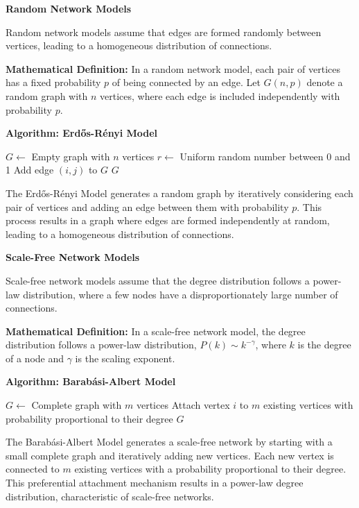 \documentclass[12pt]{book} %
\begin{document}
\textbf{Random Network Models}

Random network models assume that edges are formed randomly between vertices, leading to a homogeneous distribution of connections.

\textbf{Mathematical Definition:} In a random network model, each pair of vertices has a fixed probability \( p \) of being connected by an edge. Let \( G(n, p) \) denote a random graph with \( n \) vertices, where each edge is included independently with probability \( p \).

\textbf{Algorithm: Erdős-Rényi Model}
\FloatBarrier
\begin{algorithm}
\caption{Erdős-Rényi Model}
\begin{algorithmic}[1]
\State $G \gets$ Empty graph with $n$ vertices
        \State $r \gets$ Uniform random number between 0 and 1
            \State Add edge $(i, j)$ to $G$
        \EndIf
    \EndFor
\EndFor
\State \Return $G$
\EndFunction
\end{algorithmic}
\end{algorithm}
\FloatBarrier
The Erdős-Rényi Model generates a random graph by iteratively considering each pair of vertices and adding an edge between them with probability \( p \). This process results in a graph where edges are formed independently at random, leading to a homogeneous distribution of connections.

\textbf{Scale-Free Network Models}

Scale-free network models assume that the degree distribution follows a power-law distribution, where a few nodes have a disproportionately large number of connections.

\textbf{Mathematical Definition:} In a scale-free network model, the degree distribution follows a power-law distribution, \( P(k) \sim k^{-\gamma} \), where \( k \) is the degree of a node and \( \gamma \) is the scaling exponent.

\textbf{Algorithm: Barabási-Albert Model}
\FloatBarrier
\begin{algorithm}
\caption{Barabási-Albert Model}
\begin{algorithmic}[1]
\State $G \gets$ Complete graph with $m$ vertices
    \State Attach vertex $i$ to $m$ existing vertices with probability proportional to their degree
\EndFor
\State \Return $G$
\EndFunction
\end{algorithmic}
\end{algorithm}
\FloatBarrier
The Barabási-Albert Model generates a scale-free network by starting with a small complete graph and iteratively adding new vertices. Each new vertex is connected to \( m \) existing vertices with a probability proportional to their degree. This preferential attachment mechanism results in a power-law degree distribution, characteristic of scale-free networks.
\end{document}

